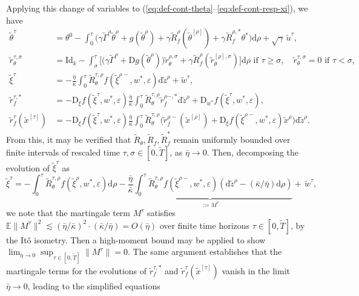 \documentclass[11pt,letterpaper,reqno]{amsart}
\theoremstyle{definition}
\def\eps{\varepsilon}
\def\d{\mathrm{d}}
\def\D{\mathrm{D}}
\def\E{\mathbb{E}}
\def\Id{\mathrm{Id}}
\begin{document}
Applying this change of variables to
(\ref{eq:def-cont-theta}--\ref{eq:def-cont-resp-xi}), we have
\begin{align}
\tilde\theta^{\tau}&= \theta^0 - \int_0^{\tau} \Big({\gamma}\tilde\Gamma^\rho
\tilde\theta^\rho+g(\tilde\theta^\rho)+{\gamma}\tilde R_f^\rho(\tilde\theta^{[\rho]})+
{\gamma}\tilde R_f^{\rho,*}\theta^*\Big)\d \rho+\sqrt{\gamma}\,\tilde
u^{\tau},\label{eq:thetaGF}\\
\tilde r_\theta^{\tau,\sigma}&=\Id_k-\int_\sigma^\tau
\Big[\Big({\gamma}\tilde\Gamma^\rho+\D g(\tilde
\theta^\rho)\Big)\tilde r_\theta^{\rho,\sigma}
+\gamma\tilde R_f^\rho(\tilde
r_\theta^{[\rho],\sigma})\Big]\d \rho \text{ if } \tau \geq \sigma,
\quad \tilde r_\theta^{\tau,\sigma}=0 \text{ if }
\tau<\sigma,\label{eq:rthetaGF}\\
\tilde\xi^\tau&={-}\frac{\bar\eta}{\bar\kappa}
\int_0^\tau \tilde R_\theta^{\tau,\rho}
f(\tilde\xi^{\rho-},w^*,\eps)\d \tilde z^\rho+\tilde w^\tau,\\
\tilde r_f^{\tau,*}&={-}\D_\xi f(\tilde \xi^\tau,w^*,\eps)
\frac{\bar\eta}{\bar\kappa}
\int_0^\tau \tilde R_\theta^{\tau,\rho}\tilde r_f^{\rho-,*}\d \tilde z^\rho
+\D_{w^*} f(\tilde \xi^\tau,w^*,\eps),\\
\tilde r_f^\tau(\tilde x^{[\tau]})
&={-}\D_\xi f(\tilde \xi^\tau,w^*,\eps)
\frac{\bar\eta}{\bar\kappa}\int_0^\tau \tilde R_\theta^{\tau,\rho}
\Big(\tilde r_f^{\rho-}(\tilde x^{[\rho]})
+\D_\xi f(\tilde \xi^{\rho-},w^*,\eps)\tilde x^\rho\Big)\d \tilde z^\rho.
\end{align}
From this, it may be verified that $\tilde R_\theta,\tilde R_f,\tilde R_f^*$
remain uniformly bounded over finite intervals of rescaled time
$\tau,\sigma \in [0,\tilde T]$, as $\bar\eta \to 0$. Then, decomposing
the evolution of $\tilde \xi^\tau$ as
\[\tilde\xi^\tau= {-}\int_0^\tau \tilde R_\theta^{\tau,\rho}
f(\tilde\xi^\rho,w^*,\eps)\d \rho - \underbrace{\frac{\bar\eta}{\bar\kappa}
\int_0^\tau \tilde R_\theta^{\tau,\rho}
f(\tilde\xi^{\rho-},w^*,\eps)(\d \tilde
z^\rho-(\bar\kappa/\bar\eta)\d\rho)}_{:=M^\tau}+\,\tilde w^\tau,\]
we note that the martingale term $M^\tau$ satisfies
$\E\|M^\tau\|^2 \lesssim (\bar\eta/\bar\kappa)^2
\cdot (\bar\kappa/\bar\eta)=O(\bar\eta)$
over finite time horizons $\tau \in [0,\tilde T]$,
by the It\^o isometry. Then a
high-moment bound may be applied to show
$\lim_{\bar\eta \to 0} \sup_{\tau \in [0,\tilde T]} \|M^\tau\|=0$. The
same argument establishes that the martingale terms for the evolutions of
$\tilde r_f^{\tau,*}$ and $\tilde r_f^\tau(\tilde x^{[\tau]})$ vanish in the
limit $\bar\eta \to 0$, leading to the simplified equations
\end{document}
